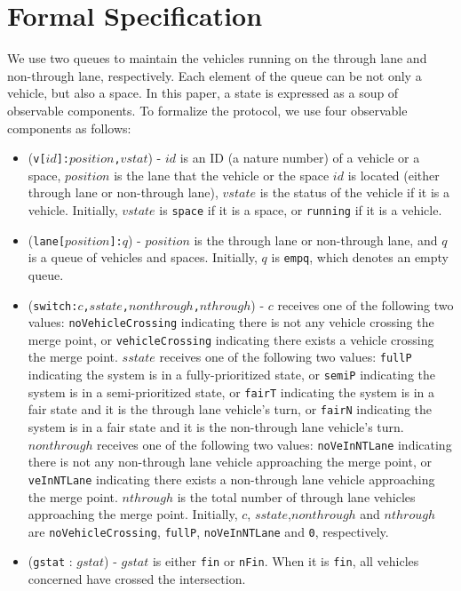 \documentclass[10pt, conference, compsocconf]{IEEEtran}
\begin{document}
\section{Formal Specification}
 \label{sect_formal}
We use two queues to maintain the vehicles running on the through lane and non-through lane, respectively.
Each element of the queue can be not only a vehicle, but also a space.
In this paper, a state is expressed as a soup of observable components.
To formalize the protocol, we use four observable components as follows:
\begin{itemize}
    \item (\verb!v[!$id$\verb!]:!$position$\verb!,!$vstat$) - $id$ is an ID (a nature number) of a vehicle or a space, $position$ is the lane that the vehicle or the space $id$ is located (either through lane or non-through lane), $vstate$ is the status of the vehicle if it is a vehicle. Initially, $vstate$ is \verb!space! if it is a space, or \verb!running! if it is a vehicle.
    \item (\verb!lane[!$position$\verb!]:!$q$) - $position$ is the through lane or non-through lane, and $q$ is a queue of vehicles and spaces. Initially, $q$ is \verb!empq!, which denotes an empty queue.
    \item (\verb!switch:!$c$\verb!,!$sstate$\verb!,!$nonthrough$\verb!,!$nthrough$) - $c$ receives one of the following two values: \verb!noVehicleCrossing! indicating there is not any vehicle crossing the merge point, or \verb!vehicleCrossing! indicating there exists a vehicle crossing the merge point.
    $sstate$ receives one of the following two values: 
    \verb!fullP! indicating the system is in a fully-prioritized state, or
    \verb!semiP! indicating the system is in a semi-prioritized state, or 
    \verb!fairT! indicating the system is in a fair state and it is the through lane vehicle's turn, or 
    \verb!fairN! indicating the system is in a fair state and it is the non-through lane vehicle's turn.
    $nonthrough$ receives one of the following two values: \verb!noVeInNTLane! indicating there is not any non-through lane vehicle approaching the merge point, or \verb!veInNTLane! indicating there exists a non-through lane vehicle approaching the merge point. 
    $nthrough$ is the total number of through lane vehicles approaching the merge point.
    Initially, $c$, $sstate$,$nonthrough$ and $nthrough$ are \verb!noVehicleCrossing!, \verb!fullP!, \verb!noVeInNTLane! and \verb!0!, respectively.
    \item (\verb!gstat! : $gstat$) -  $gstat$ is either \verb!fin! or \verb!nFin!.
	When it is \verb!fin!, all vehicles concerned have crossed the intersection.
\end{itemize}
\end{document}
